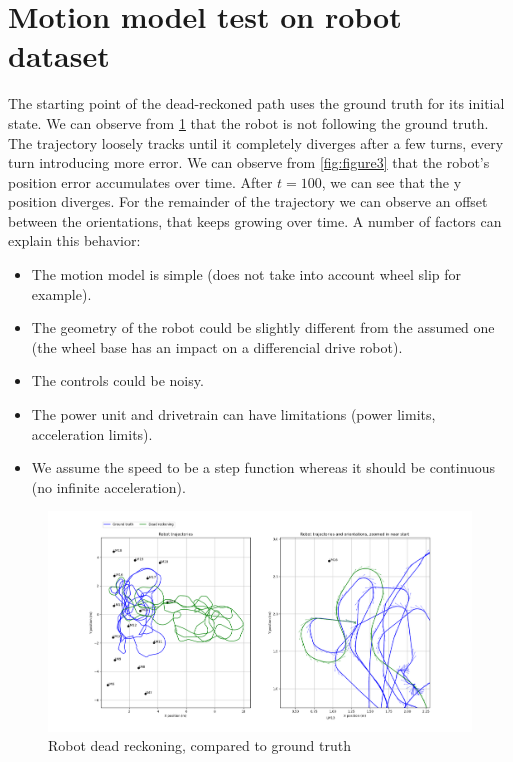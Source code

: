 \documentclass{article}
\begin{document}
\section{Motion model test on robot dataset}
The starting point of the dead-reckoned path uses the ground truth for its initial state. We can observe from \ref{fig:figure2} that the robot is not following the ground truth. The trajectory loosely tracks until it completely diverges after a few turns, every turn introducing more error. We can observe from \ref{fig:figure3} that the robot's position error accumulates over time. After $t=100$, we can see that the y position diverges. For the remainder of the trajectory we can observe an offset between the orientations, that keeps growing over time.
A number of factors can explain this behavior:
\begin{itemize}
      \item The motion model is simple (does not take into account wheel slip for example).
      \item The geometry of the robot could be slightly different from the assumed one (the wheel base has an impact on a differencial drive robot).
      \item The controls could be noisy.
      \item The power unit and drivetrain can have limitations (power limits, acceleration limits).
      \item We assume the speed to be a step function whereas it should be continuous (no infinite acceleration).

\end{itemize}

\begin{figure}
\centering
\includegraphics[scale=0.3]{Figure_2.png}
\caption{Robot dead reckoning, compared to ground truth}
\label{fig:figure2}
\end{figure}
\end{document}
